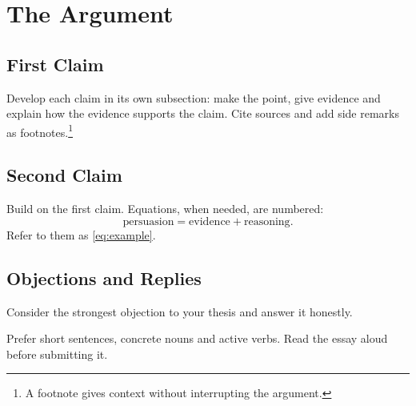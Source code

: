 \section{The Argument}

\subsection{First Claim}
Develop each claim in its own subsection: make the point, give evidence and explain how the evidence
supports the claim. Cite sources \cite{strunk1999} and add side remarks as footnotes.\footnote{A footnote
gives context without interrupting the argument.}

\subsection{Second Claim}
Build on the first claim. Equations, when needed, are numbered:
\begin{equation}\label{eq:example}
  \text{persuasion} = \text{evidence} + \text{reasoning}.
\end{equation}
Refer to them as \cref{eq:example}.

\subsection{Objections and Replies}
Consider the strongest objection to your thesis and answer it honestly.

\begin{notebox}[Style]
Prefer short sentences, concrete nouns and active verbs. Read the essay aloud before submitting it.
\end{notebox}
